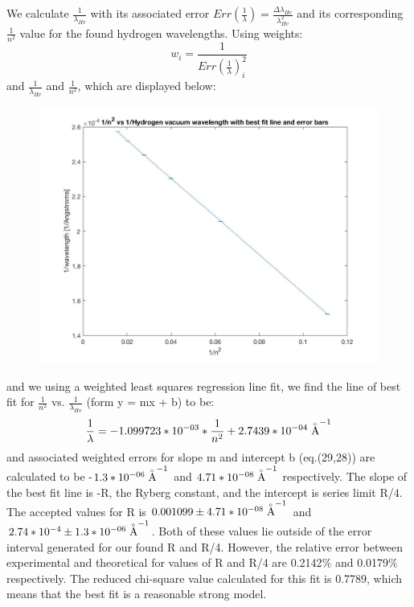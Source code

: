 \documentclass{article}
\begin{document}
    We calculate $\frac{1}{\lambda_{Hv}}$ with its associated error $Err(\frac{1}{\lambda}) = \frac{\Delta \lambda_{Hv}}{\lambda_{Hv}^2}$ and its corresponding $\frac{1}{n^2}$ value for the found hydrogen wavelengths. Using weights:
    \begin{equation}
        w_i = \frac{1}{Err(\frac{1}{\lambda})_i^2}
    \end{equation}
    and $\frac{1}{\lambda_{Hv}}$ and $\frac{1}{n^2}$, which are displayed below:
    \begin{figure}[H]
    \centering
    \includegraphics[scale = 0.2]{ATMj.jpg}
    \caption{}
    \label{fig:my_label}
\end{figure} and we using a weighted least squares regression line fit, we find the line of best fit for $\frac{1}{n^2}$ vs. $\frac{1}{\lambda_{Hv}}$ (form y = mx + b) to be:
    \begin{equation}
        \frac{1}{\lambda} = -1.099723*10^{-03}*\frac{1}{n^2} + 2.7439*10^{-04} \buildrel _\circ \over {\mathrm{A}}^{-1}
    \end{equation}
    and associated weighted errors for slope m and intercept b (eq.(29,28)) are calculated to be -$1.3*10^{-06} \buildrel _\circ \over {\mathrm{A}}^{-1}$ and $4.71*10^{-08} \buildrel _\circ \over {\mathrm{A}}^{-1}$ respectively. The slope of the best fit line is -R, the Ryberg constant, and the intercept is series limit R/4. The accepted values for R is $0.001099 \pm 4.71*10^{-08} \buildrel _\circ \over {\mathrm{A}}^{-1}$ and $2.74*10^{-4}\pm 1.3*10^{-06} \buildrel _\circ \over {\mathrm{A}}^{-1}$. Both of these values lie outside of the error interval generated for our found R and R/4. However, the relative error between experimental and theoretical for values of R and R/4 are 0.2142$\%$ and 0.0179$\%$ respectively. The reduced chi-square value calculated for this fit is 0.7789, which means that the best fit is a reasonable strong model.
    
\end{document}
